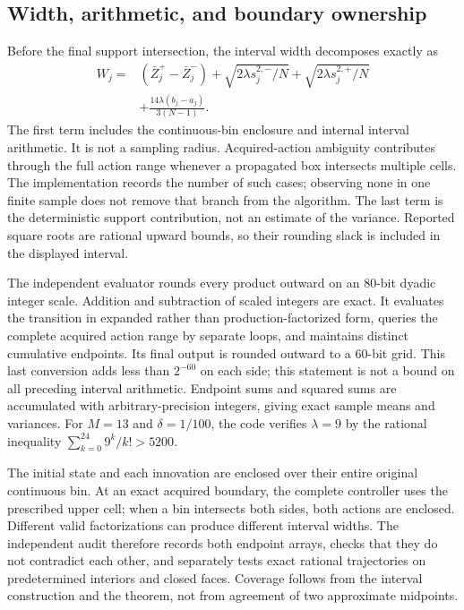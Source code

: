 \subsection{Width, arithmetic, and boundary ownership}
Before the final support intersection, the interval width decomposes exactly as
\begin{align*}
 W_j={}&(\bar Z_j^+-\bar Z_j^-)
  +\sqrt{2\lambda s_j^{2,-}/N}
  +\sqrt{2\lambda s_j^{2,+}/N}\\
 &+\frac{14\lambda(b_j-a_j)}{3(N-1)}.
\end{align*}
The first term includes the continuous-bin enclosure and internal interval arithmetic. It is not a sampling radius. Acquired-action ambiguity contributes through the full action range whenever a propagated box intersects multiple cells. The implementation records the number of such cases; observing none in one finite sample does not remove that branch from the algorithm. The last term is the deterministic support contribution, not an estimate of the variance. Reported square roots are rational upward bounds, so their rounding slack is included in the displayed interval.

The independent evaluator rounds every product outward on an $80$-bit dyadic integer scale. Addition and subtraction of scaled integers are exact. It evaluates the transition in expanded rather than production-factorized form, queries the complete acquired action range by separate loops, and maintains distinct cumulative endpoints. Its final output is rounded outward to a $60$-bit grid. This last conversion adds less than $2^{-60}$ on each side; this statement is not a bound on all preceding interval arithmetic. Endpoint sums and squared sums are accumulated with arbitrary-precision integers, giving exact sample means and variances. For $M=13$ and $\delta=1/100$, the code verifies $\lambda=9$ by the rational inequality $\sum_{k=0}^{24}9^k/k!>5200$.

The initial state and each innovation are enclosed over their entire original continuous bin. At an exact acquired boundary, the complete controller uses the prescribed upper cell; when a bin intersects both sides, both actions are enclosed. Different valid factorizations can produce different interval widths. The independent audit therefore records both endpoint arrays, checks that they do not contradict each other, and separately tests exact rational trajectories on predetermined interiors and closed faces. Coverage follows from the interval construction and the theorem, not from agreement of two approximate midpoints.
